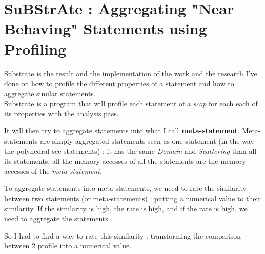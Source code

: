 \documentclass[paper=a4, fontsize=11.5pt]{scrartcl}
\numberwithin{equation}{section}        %
\numberwithin{figure}{section}          %
\numberwithin{table}{section}               %
\begin{document}
\section{SuBStrAte : Aggregating "Near Behaving" Statements using Profiling}
    Substrate is the result and the implementation of the work and the research I've done
    on how to profile the different properties of a statement and how to aggregate similar
    statements.\\
    Substrate is a program that will profile each statement of a \textit{scop} for
    each each of its properties with the analysis pass.

    It will then try to aggregate
    statements into what I call \textbf{meta-statement}. Meta-statements are simply
    aggregated statements seen as one statement (in the way the polyhedral see statements)
    : it has the same \textit{Domain} and \textit{Scattering} than all its statements,
    all the memory accesses of all the statements are the memory accesses of the \textit{meta-statement}.

    To aggregate statements into meta-statements, we need to rate the similarity between two
    statements (or meta-statements) : putting a numerical value to their similarity.
    If the similarity is high, the rate is high, and if the rate is high, we need to
    aggregate the statements.

    So I had to find a way to rate this similarity : transforming the comparison between
    2 profile into a numerical value.
\end{document}

